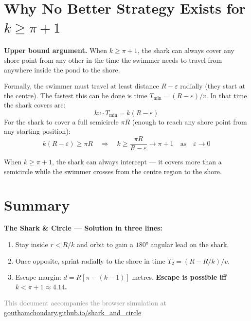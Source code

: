 \documentclass[12pt, a4paper]{article}
\theoremstyle{definition}
\begin{document}
\section{Why No Better Strategy Exists for $k \geq \pi + 1$}

\begin{warnbox}
\textbf{Upper bound argument.} When $k \geq \pi + 1$, the shark can always cover any shore point from any other in the time the swimmer needs to travel from anywhere inside the pond to the shore.
\end{warnbox}

Formally, the swimmer must travel at least distance $R - \varepsilon$ radially (they start at the centre). The fastest this can be done is time $T_{\min} = (R - \varepsilon)/v$. In that time the shark covers arc:
\[
  kv \cdot T_{\min} = k(R - \varepsilon)
\]
For the shark to cover a full semicircle $\pi R$ (enough to reach any shore point from any starting position):
\[
  k(R - \varepsilon) \geq \pi R
  \quad\Longrightarrow\quad
  k \geq \frac{\pi R}{R - \varepsilon} \to \pi + 1 \quad \text{as} \quad \varepsilon \to 0
\]

When $k \geq \pi + 1$, the shark can always intercept — it covers more than a semicircle while the swimmer crosses from the centre region to the shore.

\section{Summary}

\begin{resultbox}
\textbf{The Shark \& Circle — Solution in three lines:}

\medskip
\begin{enumerate}[leftmargin=1.5em, itemsep=6pt]
  \item Stay inside $r < R/k$ and orbit to gain a $180°$ angular lead on the shark.
  \item Once opposite, sprint radially to the shore in time $T_2 = (R - R/k)/v$.
  \item Escape margin: $d = R[\pi - (k-1)]$ metres. \textbf{Escape is possible iff $k < \pi + 1 \approx 4.14$.}
\end{enumerate}
\end{resultbox}

\vspace{1em}
\begin{center}
  \small\textcolor{gray}{
    This document accompanies the browser simulation at
    \href{https://gouthamchoudary.github.io/shark_and_circle/}%
         {gouthamchoudary.github.io/shark\_and\_circle}
  }
\end{center}
\end{document}
